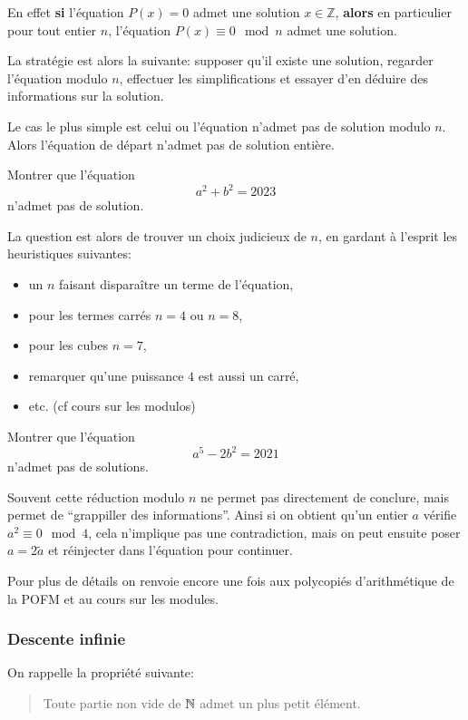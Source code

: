 En effet \textbf{si} l'équation $P(x)=0$ admet une solution $x \in \mathbb{Z}$, \textbf{alors} en particulier pour tout entier $n$, l'équation $P(x) \equiv 0 \mod n$ admet une solution.

La stratégie est alors la suivante: supposer qu'il existe une solution, regarder l'équation modulo $n$, effectuer les simplifications et essayer d'en déduire des informations sur la solution.

Le cas le plus simple est celui ou l'équation n'admet pas de solution modulo $n$. Alors l'équation de départ n'admet pas de solution entière.

\begin{exo}
  Montrer que l'équation
  $$a^2 + b^2 = 2023$$
  n'admet pas de solution.
\end{exo}

La question est alors de trouver un choix judicieux de $n$, en gardant à l'esprit les heuristiques suivantes:
\begin{itemize}
  \item un $n$ faisant disparaître un terme de l'équation,
  \item pour les termes carrés $n=4$ ou $n=8$,
  \item pour les cubes $n=7$,
  \item remarquer qu'une puissance $4$ est aussi un carré,
  \item etc. (cf cours sur les modulos)
\end{itemize}

\begin{exo}
  Montrer que l'équation
  $$a^{5} - 2 b^2 = 2021$$
  n'admet pas de solutions.
\end{exo}


Souvent cette réduction modulo $n$ ne permet pas directement de conclure, mais permet de ``grappiller des informations''. Ainsi si on obtient qu'un entier $a$ vérifie $a^2 \equiv 0 \mod 4$, cela n'implique pas une contradiction, mais on peut ensuite poser $a = 2 \widetilde{a}$ et réinjecter dans l'équation pour continuer.

Pour plus de détails on renvoie encore une fois aux polycopiés d'arithmétique de la POFM et au cours sur les modules.


\subsubsection{Descente infinie}

On rappelle la propriété suivante:
\begin{quote}
  Toute partie non vide de $\mathbb N$ admet un plus petit élément.
\end{quote}

